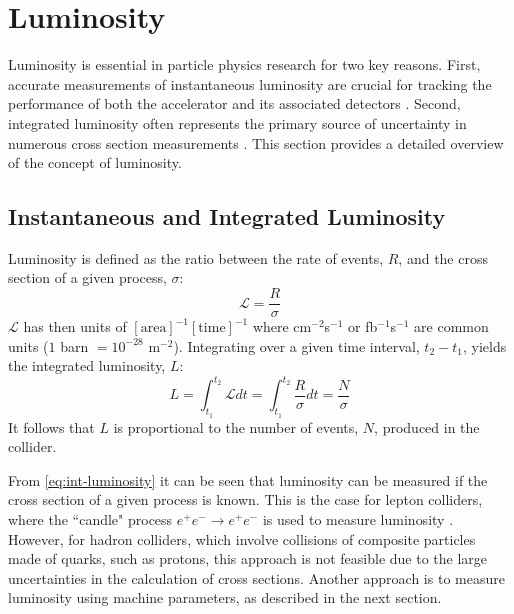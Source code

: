 \section{Luminosity}
\label{sec:luminosity}

Luminosity is essential in particle physics research for two key reasons. First, accurate measurements of instantaneous luminosity are crucial for tracking the performance of both the accelerator and its associated detectors \cite{PhysRevAccelBeams.21.102801}. Second, integrated luminosity often represents the primary source of uncertainty in numerous cross section measurements \cite{cms2022measurement, sirunyan2019measurement}. This section provides a detailed overview of the concept of luminosity.

\subsection{Instantaneous and Integrated Luminosity}

Luminosity is defined as the ratio between the rate of events, $R$, and the cross section of a given process, $\sigma$:
\begin{equation}
    \label{eq:inst-luminosity}
    \mathcal{L} = \frac{R}{\sigma}
\end{equation}
$\mathcal{L}$ has then units of $[\mathrm{area}]^{-1} [\mathrm{time}]^{-1}$ where cm$^{-2}$s$^{-1}$ or fb$^{-1}$s$^{-1}$ are common units ($1$ barn  $= 10^{-28}$ m$^{-2}$). Integrating over a given time interval, $t_2 - t_1$, yields the integrated luminosity, $L$:
\begin{equation}
    \label{eq:int-luminosity}
    L = \int_{t_1}^{t_2} \mathcal{L} dt = \int_{t_1}^{t_2} \frac{R}{\sigma} dt = \frac{N}{\sigma}
\end{equation}
It follows that $L$ is proportional to the number of events, $N$, produced in the collider.

From \autoref{eq:int-luminosity} it can be seen that luminosity can be measured if the cross section of a given process is known. This is the case for lepton colliders, where the ``candle" process $e^+ e^- \rightarrow e^+ e^-$ is used to measure luminosity \cite{Burkhardt:1056691}. However, for hadron colliders, which involve collisions of composite particles made of quarks, such as protons, this approach is not feasible due to the large uncertainties in the calculation of cross sections. Another approach is to measure luminosity using machine parameters, as described in the next section.

